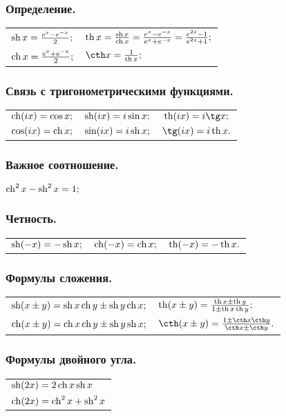 \subsubsection{Определение.}
\begin{tabular}{l l}
$\sh x = \frac{e^{x}-e^{-x}}{2};$
&
$\th x = \frac{\sh x}{\ch x}=\frac{e^{x}-e^{-x}}{e^{x}+e^{-x}}=\frac{e^{2x}-1}{e^{2x}+1};$
\\
$\ch x = \frac{e^{x}+e^{-x}}{2};$
&
$\cth x = \frac{1}{\th x};$
\end{tabular}
\subsubsection{Связь с тригонометрическими функциями.}
\begin{tabular}{c c c}
$\ch (ix) = \cos x;$
&
$\sh (ix)= i \sin x;$
&
$\th (ix) = i \tg x;$
\\
$\cos (ix) = \ch x;$
&
$\sin (ix) = i \sh x;$
&
$\tg (ix) = i \th x.$
\end{tabular}
\subsubsection{Важное соотношение.}
$\ch^2 x - \sh^2 x = 1;$

\subsubsection{Четность.}
\begin{tabular}{l l l}
$\sh (-x) = -\sh x;$
&
$\ch (-x) = \ch x;$
&
$\th (-x) = -\th x.$
\end{tabular}
\subsubsection{Формулы сложения.}
\begin{tabular}{l l}
$\sh (x\pm y) =  \sh x \ch y \pm \sh y \ch x;$
&
$\th (x \pm y) = \frac{\th x \pm \th y}{1 \pm \th x \th y};$
\\
$\ch (x\pm y) =  \ch x \ch y \pm \sh y \sh x;$
&
$\cth (x \pm y) = \frac{1 \pm \cth x \cth y}{\cth x \pm \cth y}.$
\end{tabular}
\subsubsection{Формулы двойного угла.}
\begin{tabular}{l}
$\sh (2x) = 2\ch x\sh x$
\\
$\ch (2x) = \ch^2 x + \sh^2 x$
\end{tabular}
